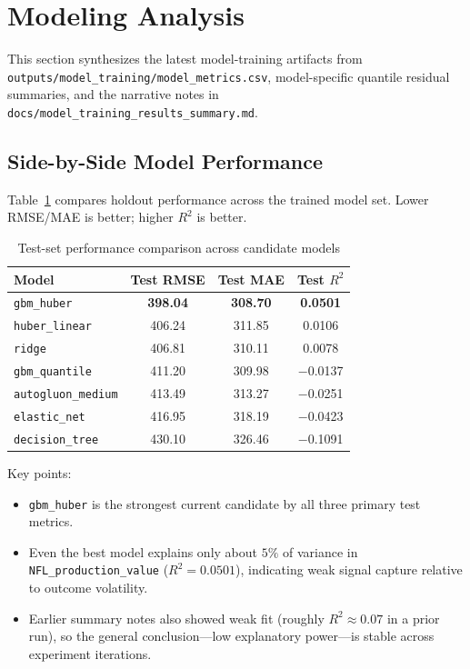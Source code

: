 \section{Modeling Analysis}

This section synthesizes the latest model-training artifacts from \texttt{outputs/model\_training/model\_metrics.csv}, model-specific quantile residual summaries, and the narrative notes in \texttt{docs/model\_training\_results\_summary.md}.

\subsection{Side-by-Side Model Performance}

Table~\ref{tab:model-comparison} compares holdout performance across the trained model set. Lower RMSE/MAE is better; higher $R^2$ is better.

\begin{table}[h]
\centering
\caption{Test-set performance comparison across candidate models}
\label{tab:model-comparison}
\begin{tabular}{lccc}
\hline
Model & Test RMSE & Test MAE & Test $R^2$ \\
\hline
\texttt{gbm\_huber} & \textbf{398.04} & \textbf{308.70} & \textbf{0.0501} \\
\texttt{huber\_linear} & 406.24 & 311.85 & 0.0106 \\
\texttt{ridge} & 406.81 & 310.11 & 0.0078 \\
\texttt{gbm\_quantile} & 411.20 & 309.98 & $-$0.0137 \\
\texttt{autogluon\_medium} & 413.49 & 313.27 & $-$0.0251 \\
\texttt{elastic\_net} & 416.95 & 318.19 & $-$0.0423 \\
\texttt{decision\_tree} & 430.10 & 326.46 & $-$0.1091 \\
\hline
\end{tabular}
\end{table}

Key points:
\begin{itemize}
    \item \texttt{gbm\_huber} is the strongest current candidate by all three primary test metrics.
    \item Even the best model explains only about $5\%$ of variance in \texttt{NFL\_production\_value} ($R^2=0.0501$), indicating weak signal capture relative to outcome volatility.
    \item Earlier summary notes also showed weak fit (roughly $R^2\approx0.07$ in a prior run), so the general conclusion---low explanatory power---is stable across experiment iterations.
\end{itemize}

